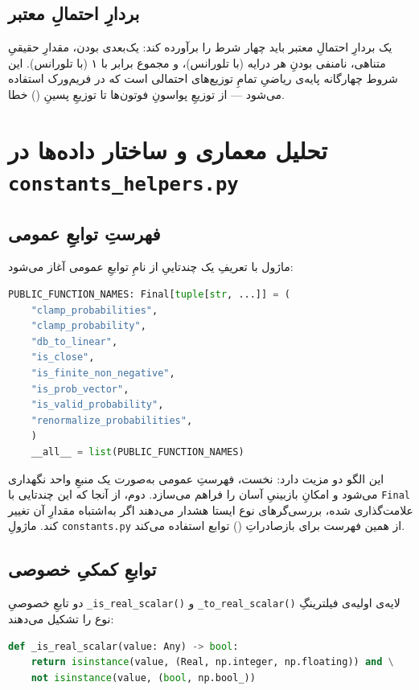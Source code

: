 \subsection{بردارِ احتمالِ معتبر}

یک بردارِ احتمالِ معتبر باید چهار شرط را برآورده کند: یک‌بعدی بودن، مقدارِ حقیقیِ متناهی، نامنفی بودنِ هر درایه (با تلورانس)، و مجموع برابر با ۱ (با تلورانس). این شروط چهارگانه پایه‌ی ریاضیِ تمامِ توزیع‌های احتمالی است که در فریم‌ورک استفاده می‌شود — از توزیعِ پواسونِ فوتون‌ها تا توزیعِ پسینِ () خطا.

\section{تحلیل معماری و ساختار داده‌ها در \texttt{constants\_helpers.py}}

\subsection{فهرستِ توابعِ عمومی}

ماژول با تعریفِ یک چندتاییِ  از نامِ توابعِ عمومی آغاز می‌شود:

\begin{lstlisting}[language=Python]
	PUBLIC_FUNCTION_NAMES: Final[tuple[str, ...]] = (
	"clamp_probabilities",
	"clamp_probability",
	"db_to_linear",
	"is_close",
	"is_finite_non_negative",
	"is_prob_vector",
	"is_valid_probability",
	"renormalize_probabilities",
	)
	__all__ = list(PUBLIC_FUNCTION_NAMES)
\end{lstlisting}

این الگو دو مزیت دارد: نخست، فهرستِ  عمومی به‌صورت یک منبعِ واحد نگهداری می‌شود و امکانِ بازبینیِ آسان را فراهم می‌سازد. دوم، از آنجا که این چندتایی با \texttt{Final} علامت‌گذاری شده، بررسی‌گرهای نوع ایستا هشدار می‌دهند اگر به‌اشتباه مقدارِ آن تغییر کند. ماژولِ \texttt{constants.py} از همین فهرست برای بازصادراتِ () توابع استفاده می‌کند.

\subsection{توابعِ کمکیِ خصوصی}

دو تابعِ خصوصیِ \texttt{\_is\_real\_scalar()} و \texttt{\_to\_real\_scalar()} لایه‌ی اولیه‌ی فیلترینگِ نوع را تشکیل می‌دهند:

\begin{lstlisting}[language=Python]
	def _is_real_scalar(value: Any) -> bool:
	return isinstance(value, (Real, np.integer, np.floating)) and \
	not isinstance(value, (bool, np.bool_))
\end{lstlisting}

